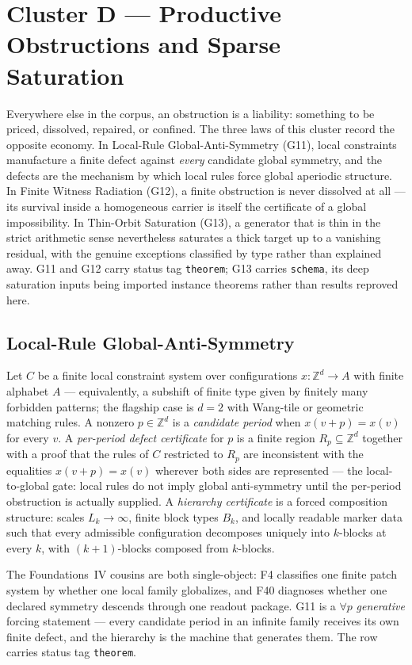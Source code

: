 \documentclass[11pt]{article}
\newcommand{\clusterD}{Productive Obstructions and Sparse Saturation}
\newcommand{\lawGEleven}{Local-Rule Global-Anti-Symmetry}
\newcommand{\lawGTwelve}{Finite Witness Radiation}
\newcommand{\lawGThirteen}{Thin-Orbit Saturation}
\theoremstyle{definition}
\begin{document}
 \section{Cluster D --- \clusterD}\label{sec:clusterD}

Everywhere else in the corpus, an obstruction is a liability: something to be priced, dissolved,
repaired, or confined. The three laws of this cluster record the opposite economy. In \lawGEleven{}
(G11), local constraints manufacture a finite defect against \emph{every} candidate global symmetry,
and the defects are the mechanism by which local rules force global aperiodic structure. In
\lawGTwelve{} (G12), a finite obstruction is never dissolved at all --- its survival inside a
homogeneous carrier is itself the certificate of a global impossibility. In \lawGThirteen{} (G13), a
generator that is thin in the strict arithmetic sense nevertheless saturates a thick target up to a
vanishing residual, with the genuine exceptions classified by type rather than explained away. G11
and G12 carry status tag \texttt{theorem}; G13 carries \texttt{schema}, its deep saturation inputs
being imported instance theorems rather than results reproved here.

\subsection{\lawGEleven}\label{sec:clusterD:g11}

Let $C$ be a finite local constraint system over configurations $x : \mathbb{Z}^d \to A$ with finite
alphabet $A$ --- equivalently, a subshift of finite type given by finitely many forbidden patterns;
the flagship case is $d = 2$ with Wang-tile or geometric matching rules. A nonzero $p \in
\mathbb{Z}^d$ is a \emph{candidate period} when $x(v + p) = x(v)$ for every $v$. A \emph{per-period
defect certificate} for $p$ is a finite region $R_p \subseteq \mathbb{Z}^d$ together with a proof
that the rules of $C$ restricted to $R_p$ are inconsistent with the equalities $x(v+p) = x(v)$
wherever both sides are represented --- the local-to-global gate: local rules do not imply global
anti-symmetry until the per-period obstruction is actually supplied. A \emph{hierarchy certificate}
is a forced composition structure: scales $L_k \to \infty$, finite block types $B_k$, and locally
readable marker data such that every admissible configuration decomposes uniquely into $k$-blocks at
every $k$, with $(k{+}1)$-blocks composed from $k$-blocks.

The Foundations~IV cousins are both single-object: F4 classifies one finite patch system by whether
one local family globalizes, and F40 diagnoses whether one declared symmetry descends through one
readout package. G11 is a $\forall p$ \emph{generative} forcing statement --- every candidate period
in an infinite family receives its own finite defect, and the hierarchy is the machine that generates
them. The row carries status tag \texttt{theorem}.
\end{document}

